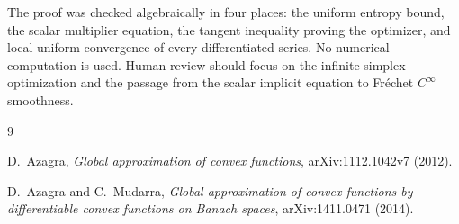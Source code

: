 \documentclass[11pt]{article}
\begin{document}
The proof was checked algebraically in four places: the uniform entropy
bound, the scalar multiplier equation, the tangent inequality proving the
optimizer, and local uniform convergence of every differentiated series.
No numerical computation is used.  Human review should focus on the
infinite-simplex optimization and the passage from the scalar implicit
equation to Fr\'echet $C^\infty$ smoothness.

\begin{thebibliography}{9}

D.~Azagra,
\emph{Global approximation of convex functions},
arXiv:1112.1042v7 (2012).

D.~Azagra and C.~Mudarra,
\emph{Global approximation of convex functions by differentiable convex
functions on Banach spaces},
arXiv:1411.0471 (2014).

\end{thebibliography}
\end{document}
